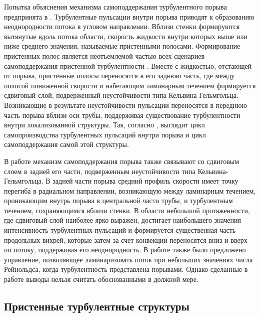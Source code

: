 Попытка объяснения механизма самоподдержания турбулентного порыва предпринята в \cite{Shimizu2009}. Турбулентные пульсации внутри порыва приводят к образованию неоднородности потока в угловом направлении. Вблизи стенки формируются вытянутые вдоль потока области, скорость жидкости внутри которых выше или ниже среднего значения, называемые пристенными полосами. Формирование пристенных полос является неотъемлемой частью всех сценариев самоподдержания пристенной турбулентности \cite{Hamilton1995, Waleffe1997, Schoppa2002}. Вместе с жидкостью, отстающей от порыва, пристенные полосы переносятся в его заднюю часть, где между полосой пониженной скорости и набегающим ламинарным течением формируется сдвиговый слой, подверженный неустойчивости типа Кельвина-Гельмгольца. Возникающие в результате неустойчивости пульсации переносятся в переднюю часть порыва вблизи оси трубы, поддерживая существование турбулентности внутри локализованной структуры. Так, согласно \cite{Shimizu2009}, выглядит цикл самопроизводства турбулентных пульсаций внутри порыва и цикл самоподдержания самой этой структуры. 

В работе \cite{Hof2010} механизм самоподдержания порыва также связывают со сдвиговым слоем в задней его части, подверженным неустойчивости типа Кельвина-Гельмгольца. В задней части порыва средний профиль скорости имеет точку перегиба в радиальном направлении, возникающую между ламинарным течением, проникающим внутрь порыва в центральной части трубы, и турбулентным течением, сохраняющимся вблизи стенки. В области небольшой протяженности, где сдвиговый слой наиболее ярко выражен, достигает наибольшего значения интенсивность турбулентных пульсаций и формируется существенная часть продольных вихрей, которые затем за счет конвекции переносятся вниз и вверх по потоку, поддерживая его неоднородность. В работе \cite{Hof2010} также было предложено управление, позволяющее ламинаризовать поток при небольших значениях числа Рейнольдса, когда турбулентность представлена порывами. Однако сделанные в работе выводы нельзя считать обоснованными в должной мере. 


	\subsection{Пристенные турбулентные структуры} \label{structure_subsection}


